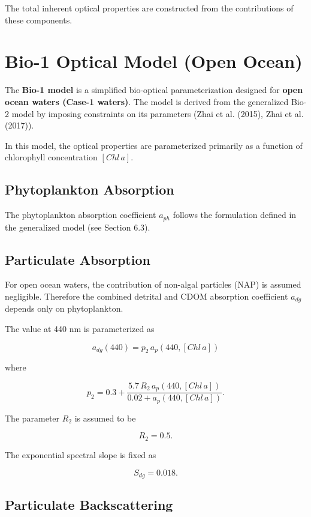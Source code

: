 \documentclass[
  letterpaper,
  open=any]{scrbook}
\begin{document}
The total inherent optical properties are constructed from the
contributions of these components.

\section{Bio-1 Optical Model (Open
Ocean)}\label{bio-1-optical-model-open-ocean}

The \textbf{Bio-1 model} is a simplified bio-optical parameterization
designed for \textbf{open ocean waters (Case-1 waters)}. The model is
derived from the generalized Bio-2 model by imposing constraints on its
parameters (Zhai et al. (2015), Zhai et al. (2017)).

In this model, the optical properties are parameterized primarily as a
function of chlorophyll concentration \([Chl\,a]\).

\subsection{Phytoplankton Absorption}\label{phytoplankton-absorption}

The phytoplankton absorption coefficient \(a_{ph}\) follows the
formulation defined in the generalized model (see Section 6.3).

\subsection{Particulate Absorption}\label{particulate-absorption}

For open ocean waters, the contribution of non-algal particles (NAP) is
assumed negligible. Therefore the combined detrital and CDOM absorption
coefficient \(a_{dg}\) depends only on phytoplankton.

The value at 440 nm is parameterized as

\[
a_{dg}(440) = p_2\, a_p(440,[Chl\,a])
\]

where

\[
p_2 = 0.3 + \frac{5.7\,R_2\,a_p(440,[Chl\,a])}{0.02 + a_p(440,[Chl\,a])}.
\]

The parameter \(R_2\) is assumed to be

\[
R_2 = 0.5.
\]

The exponential spectral slope is fixed as

\[
S_{dg} = 0.018.
\]

\subsection{Particulate
Backscattering}\label{particulate-backscattering}
\end{document}
